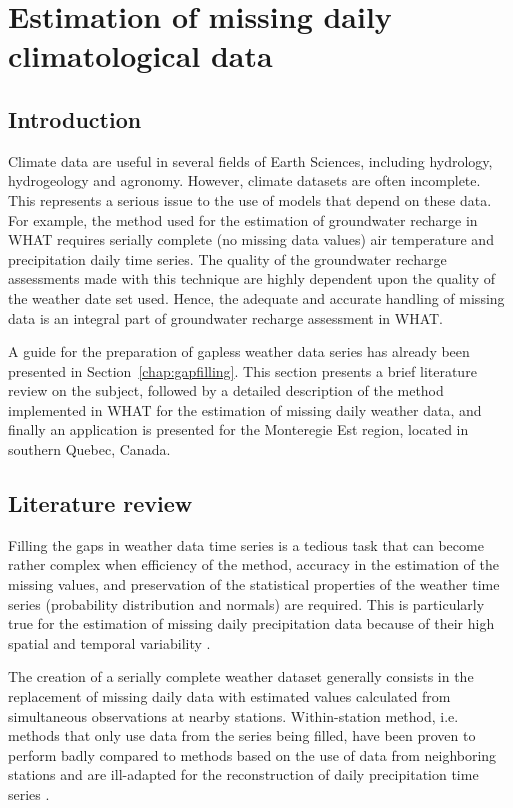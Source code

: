\documentclass[WHATMANUAL.tex]{subfiles}
\begin{document}
\chapter{Estimation of missing daily climatological data}\label{chap:Missing_weather_theory}

\section{Introduction}

Climate data are useful in several fields of Earth Sciences, including hydrology, hydrogeology and agronomy. However, climate datasets are often incomplete. This represents a serious issue to the use of models that depend on these data. For example, the method used for the estimation of groundwater recharge in WHAT requires serially complete (no missing data values) air temperature and precipitation daily time series. The quality of the groundwater recharge assessments made with this technique are highly dependent upon the quality of the weather date set used. Hence, the adequate and accurate handling of missing data is an integral part of groundwater recharge assessment in WHAT.

A guide for the preparation of gapless weather data series has already been presented in Section~\ref{chap:gapfilling}. This section presents a brief literature review on the subject, followed by a detailed description of the method implemented in WHAT for the estimation of missing daily weather data, and finally an application is presented for the Monteregie Est region, located in southern Quebec, Canada. 

\section{Literature review}

Filling the gaps in weather data time series is a tedious task that can become rather complex when efficiency of the method, accuracy in the estimation of the missing values, and preservation of the statistical properties of the weather time series (probability distribution and normals) are required. This is particularly true for the estimation of missing daily precipitation data because of their high spatial and temporal variability \citep{simolo_improving_2010}. 

The creation of a serially complete weather dataset generally consists in the replacement of missing daily data with estimated values calculated from simultaneous observations at nearby stations. Within-station method, i.e. methods that only use data from the series being filled, have been proven to perform badly compared to methods based on the use of data from neighboring stations and are ill-adapted for the reconstruction of daily precipitation time series \citep{eischeid_quality_1995,simolo_improving_2010,kemp_estimating_1983}.
\end{document}
